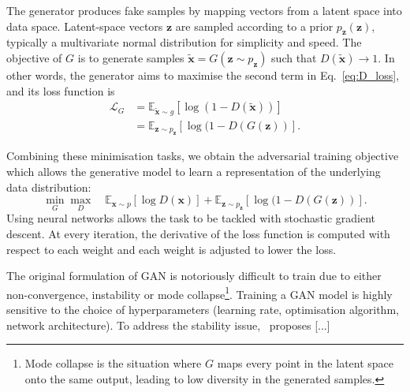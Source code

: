 The generator produces fake samples by mapping vectors from a latent space into data space. Latent-space vectors $\mathbf{z}$ are sampled according to a prior $p_\mathbf{z}(\mathbf{z})$, typically a multivariate normal distribution for simplicity and speed. The objective of $G$ is to generate samples $\tilde{\mathbf{x}} = G(\mathbf{z} \sim p_\mathbf{z})$ such that $D(\tilde{\mathbf{x}}) \rightarrow 1$. In other words, the generator aims to maximise the second term in Eq.~\ref{eq:D_loss}, and its loss function is
\begin{align*}
    \mathcal{L}_G &=     
    \mathbb{E}_{\tilde{\mathbf{x}} \sim g} [ \log( 1 - D(\tilde{\mathbf{x}}) )]\\
    &= \mathbb{E}_{\mathbf{z} \sim p_\mathbf{z}} [ \log( 1 - D(G(\mathbf{z}) )].
\end{align*}

Combining these minimisation tasks, we obtain the adversarial training objective which allows the generative model to learn a representation of the underlying data distribution:
\begin{equation*}
    \min_G \max_D \quad
    \mathbb{E}_{\mathbf{x} \sim p} [ \log D(\mathbf{x}) ] +
    \mathbb{E}_{\mathbf{z} \sim p_\mathbf{z}} [ \log( 1 - D(G(\mathbf{z}) )].
\end{equation*}
Using neural networks allows the task to be tackled with stochastic gradient descent. At every iteration, the derivative of the loss function is computed with respect to each weight and each weight is adjusted to lower the loss.

The original formulation of GAN is notoriously difficult to train due to either non-convergence, instability or mode collapse\footnote{Mode collapse is the situation where $G$ maps every point in the latent space onto the same output, leading to low diversity in the generated samples.}. Training a GAN model is highly sensitive to the choice of hyperparameters (learning rate, optimisation algorithm, network architecture). To address the stability issue,~\cite{arjovsky2017wasserstein} proposes [...]
\cite{NIPS2017_892c3b1c} %









